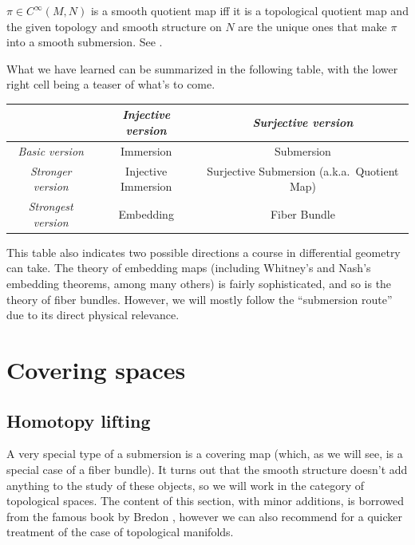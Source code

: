 \begin{rem}
    $\pi\in C^\infty(M,N)$ is a smooth quotient map iff it is a topological quotient map and the given topology and smooth structure on $N$ are the unique ones that make $\pi$ into a smooth submersion. See \cite[Problem 4-7]{Lee}.
\end{rem}

What we have learned can be summarized in the following table, with the lower right cell being a teaser of what's to come.

\begin{center}
\begin{tabular}{ccc}
    & \emph{Injective version} & \emph{Surjective version} \\
    \toprule
    \emph{Basic version} & Immersion & Submersion  \\
    \midrule
    \emph{Stronger version}  & Injective Immersion & Surjective Submersion (a.k.a.~Quotient Map) \\
    \midrule
    \emph{Strongest version}  & Embedding & Fiber Bundle \\
    \bottomrule
\end{tabular}
\end{center}
 
 This table also indicates two possible directions a course in differential geometry can take. The theory of embedding maps (including Whitney's and Nash's embedding theorems, among many others) is fairly sophisticated, and so is the theory of fiber bundles. However, we will mostly follow the ``submersion route'' due to its direct physical relevance.



\newpage

\section{Covering spaces}

\subsection{Homotopy lifting}

A very special type of a submersion is a covering map (which, as we will see, is a special case of a fiber bundle). It turns out that the smooth structure doesn't add anything to the study of these objects, so we will work in the category of topological spaces. The content of this section, with minor additions, is borrowed from the famous book by Bredon \cite{Bredon}, however we can also recommend \cite[Ch. 11]{LeeTop} for a quicker treatment of the case of topological manifolds.


